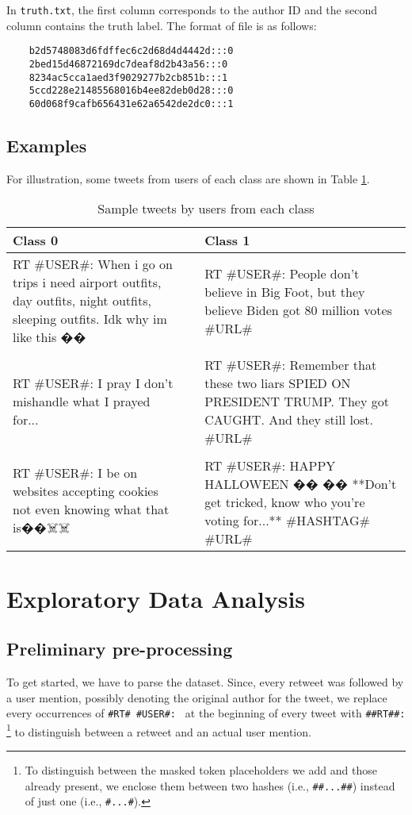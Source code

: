 In \texttt{truth.txt}, the first column corresponds to the author ID and the second column contains the truth label. The format of file is as follows:
\begin{verbatim}
    b2d5748083d6fdffec6c2d68d4d4442d:::0
    2bed15d46872169dc7deaf8d2b43a56:::0
    8234ac5cca1aed3f9029277b2cb851b:::1
    5ccd228e21485568016b4ee82deb0d28:::0
    60d068f9cafb656431e62a6542de2dc0:::1
\end{verbatim}

\subsection{Examples}
\label{sec:dataset:examples}
For illustration, some tweets from users of each class are shown in Table \ref{tab:dataset:examples}.

\begin{table}[htbp]
\centering
\begin{tabular}{p{7cm}p{1cm}p{7cm}} \hline
\textbf{Class 0} & & \textbf{Class 1}  \\ \hline
RT \#USER\#: When i go on trips i need airport outfits, day outfits, night outfits, sleeping outfits. Idk why im like this �� & & RT \#USER\#: People don't believe in Big Foot, but they believe Biden got 80 million votes \#URL\# \\ 
&&\\
RT \#USER\#: I pray I don’t mishandle what I prayed for... & & RT \#USER\#: Remember that these two liars SPIED ON PRESIDENT TRUMP. They got CAUGHT. And they still lost. \#URL\# \\
&&\\
RT \#USER\#: I be on websites accepting cookies not even knowing what that is��☠️☠️ & & RT \#USER\#: HAPPY HALLOWEEN �� �� **Don’t get tricked, know who you’re voting for...** \#HASHTAG\# \#URL\# \\ \hline
\end{tabular}
\caption{Sample tweets by users from each class}
\label{tab:dataset:examples}
\end{table}

\section{Exploratory Data Analysis}
\label{sec:dataset:eda}

\subsection{Preliminary pre-processing}
\label{sec:dataset:pre-processing}
To get started, we have to parse the dataset. Since, every retweet was followed by a user mention, possibly denoting the original author for the tweet, we replace every occurrences of \texttt{\#RT\# \#USER\#: } at the beginning of every tweet with \texttt{\#\#RT\#\#: }\footnote{To distinguish between the masked token placeholders we add and those already present, we enclose them between two hashes (i.e., \texttt{\#\#...\#\#}) instead of just one (i.e., \texttt{\#...\#}).} to distinguish between a retweet and an actual user mention.

